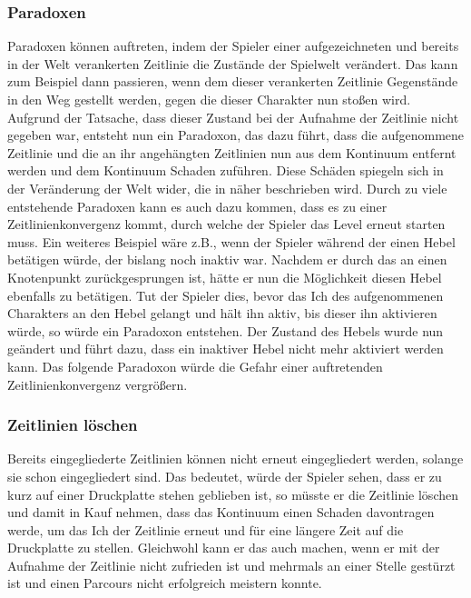 \subsubsection{Paradoxen} 
Paradoxen können auftreten, indem der Spieler einer aufgezeichneten und bereits in der Welt verankerten Zeitlinie die Zustände der Spielwelt verändert. Das kann zum Beispiel dann passieren, wenn dem  dieser verankerten Zeitlinie Gegenstände in den Weg gestellt werden, gegen die dieser Charakter nun stoßen wird. Aufgrund der Tatsache, dass dieser Zustand bei der Aufnahme der Zeitlinie nicht gegeben war, entsteht nun ein Paradoxon, das dazu führt, dass die aufgenommene Zeitlinie und die an ihr angehängten Zeitlinien nun aus dem Kontinuum entfernt werden und dem Kontinuum Schaden zuführen. Diese Schäden spiegeln sich in der Veränderung der Welt wider, die in  näher beschrieben wird. Durch zu viele entstehende Paradoxen kann es auch dazu kommen, dass es zu einer Zeitlinienkonvergenz kommt, durch welche der Spieler das Level erneut starten muss. Ein weiteres Beispiel wäre z.B., wenn der Spieler während der  einen Hebel betätigen würde, der bislang noch inaktiv war. Nachdem er durch das  an einen Knotenpunkt zurückgesprungen ist, hätte er nun die Möglichkeit diesen Hebel ebenfalls zu betätigen. Tut der Spieler dies, bevor das Ich des aufgenommenen Charakters an den Hebel gelangt und hält ihn aktiv, bis dieser ihn aktivieren würde, so würde ein Paradoxon entstehen. Der Zustand des Hebels wurde nun geändert und führt dazu, dass ein inaktiver Hebel nicht mehr aktiviert werden kann. Das folgende Paradoxon würde die Gefahr einer auftretenden Zeitlinienkonvergenz vergrößern.

\subsubsection{Zeitlinien löschen}
Bereits eingegliederte Zeitlinien können nicht erneut eingegliedert werden, solange sie schon eingegliedert sind. Das bedeutet, würde der Spieler sehen, dass er zu kurz auf einer Druckplatte stehen geblieben ist, so müsste er die Zeitlinie löschen und damit in Kauf nehmen, dass das Kontinuum einen Schaden davontragen werde, um das Ich der Zeitlinie erneut und für eine längere Zeit auf die Druckplatte zu stellen. Gleichwohl kann er das auch machen, wenn er mit der Aufnahme der Zeitlinie nicht zufrieden ist und mehrmals an einer Stelle gestürzt ist und einen Parcours nicht erfolgreich meistern konnte.

